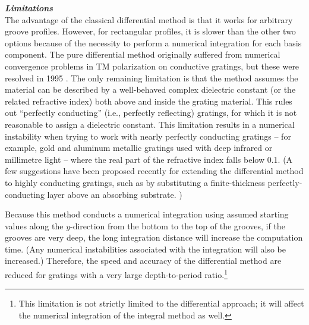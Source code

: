 \begin{description}
\noindent\textbf{\emph{Limitations}}\\
The advantage of the classical differential method is that it works for arbitrary groove profiles.  However, for rectangular profiles, it is slower than the other two options because of the necessity to perform a numerical integration for each basis component.  The pure differential method originally suffered from numerical convergence problems in TM polarization on conductive gratings, but these were resolved in 1995 \cite{Li96} \cite{Li96b} \cite{Pop00}.  The only remaining limitation is that the method assumes the material can be described by a well-behaved complex dielectric constant (or the related refractive index) both above and inside the grating material.  This rules out ``perfectly conducting'' (i.e., perfectly reflecting) gratings, for which it is not reasonable to assign a dielectric constant.  This limitation results in a numerical instability when trying to work with nearly perfectly conducting gratings -- for example, gold and aluminum metallic gratings used with deep infrared or millimetre light -- where the real part of the refractive index falls below 0.1.  (A few suggestions have been proposed recently for extending the differential method to highly conducting gratings, such as by substituting a finite-thickness perfectly-conducting layer above an absorbing substrate. \cite{Pop04})

Because this method conducts a numerical integration using assumed starting values along the $y$-direction from the bottom to the top of the grooves, if the grooves are very deep, the long integration distance will increase the computation time.  (Any numerical instabilities associated with the integration will also be increased.)  Therefore, the speed and accuracy of the differential method are reduced for gratings with a very large depth-to-period ratio.\footnote{This limitation is not strictly limited to the differential approach; it will affect the numerical integration of the integral method as well.}


\end{description}
